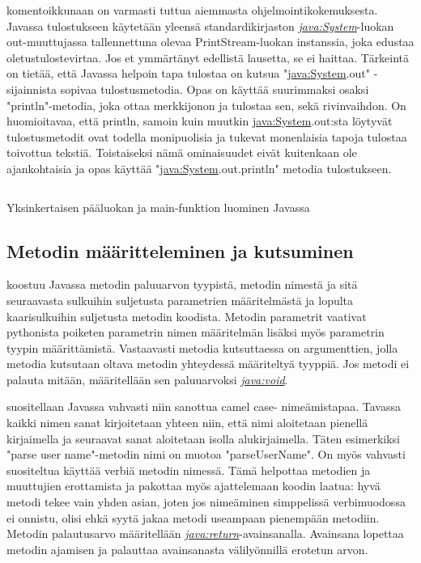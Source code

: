 \documentclass{tufte-book}
\newcommand{\java}[1]{\underline{\gls{java:#1}}}
\newcommand{\newjava}[1]{\textit{\java{#1}}}
\newcommand{\code}[3]{
\begin{listing}
    \inputminted{java}{OhjelmointiopasEsimerkit/src/#1/#2.java}
    \caption{#3}
    \label{Java-#1-#2}
\end{listing}
}
\begin{document}
 komentoikkunaan on varmasti tuttua aiemmasta
ohjelmointikokemuksesta. Javassa tulostukseen käytetään yleensä standardikirjaston 
\newjava{System}-luokan out-muuttujassa tallennettuna olevaa PrintStream-luokan instanssia, joka
edustaa oletustulostevirtaa. Jos et ymmärtänyt edellistä lausetta, se ei haittaa. Tärkeintä on
tietää, että Javassa helpoin tapa tulostaa on kutsua "\java{System}.out" - sijainnista sopivaa
tulostusmetodia. Opas on käyttää suurimmaksi osaksi "println"-metodia, joka ottaa merkkijonon ja
tulostaa sen, sekä rivinvaihdon. On huomioitavaa, että println, samoin kuin muutkin
\java{System}.out:sta löytyvät tulostusmetodit ovat todella monipuolisia ja tukevat monenlaisia
tapoja tulostaa toivottua tekstiä. Toistaiseksi nämä ominaisuudet eivät kuitenkaan ole
ajankohtaisia ja opas käyttää "\java{System}.out.println" metodia tulostukseen.

\code{week2}{HelloWorld}{Yksinkertaisen pääluokan ja main-funktion luominen Javassa}

\subsection{Metodin määritteleminen ja kutsuminen}
\label{metodi}

 koostuu Javassa metodin paluuarvon tyypistä, metodin nimestä
ja sitä seuraavasta sulkuihin suljetusta parametrien määritelmästä ja lopulta kaarisulkuihin
suljetusta metodin koodista. Metodin parametrit vaativat pythonista poiketen parametrin nimen
määritelmän lisäksi myös parametrin tyypin määrittämistä. Vastaavasti metodia kutsuttaessa on
argumenttien, jolla metodia kutsutaan oltava metodin yhteydessä määriteltyä tyyppiä. Jos metodi
ei palauta mitään, määritellään sen paluuarvoksi \newjava{void}.

 suositellaan Javassa vahvasti niin sanottua camel case-
nimeämistapaa. Tavassa kaikki nimen sanat kirjoitetaan yhteen niin, että nimi aloitetaan
pienellä kirjaimella ja seuraavat sanat aloitetaan isolla alukirjaimella. Täten esimerkiksi
"parse user name"-metodin nimi on muotoa "parseUserName". On myös vahvasti suositeltua käyttää
verbiä metodin nimessä. Tämä helpottaa metodien ja muuttujien erottamista ja pakottaa
myös ajattelemaan koodin laatua: hyvä metodi tekee vain yhden asian, joten jos nimeäminen
simppelissä verbimuodossa ei onnistu, olisi ehkä syytä jakaa metodi useampaan pienempään
metodiin. Metodin palautusarvo määritellään \newjava{return}-avainsanalla. Avainsana lopettaa
metodin ajamisen ja palauttaa avainsanasta välilyönnillä erotetun arvon.
\end{document}
